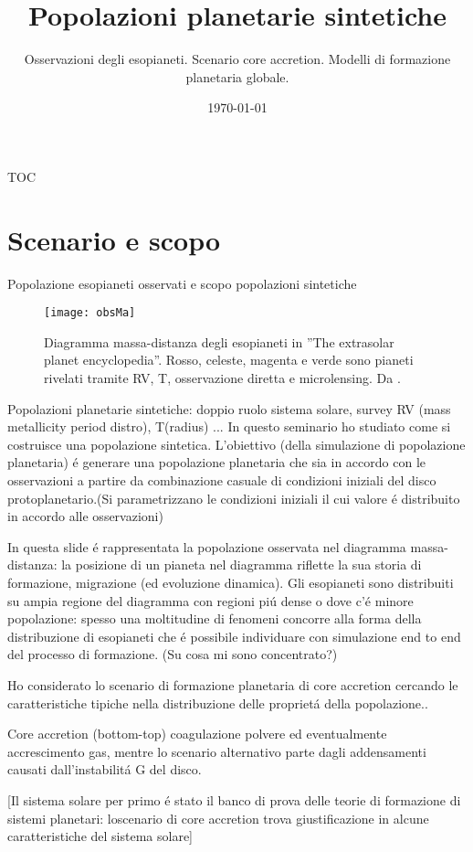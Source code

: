 \documentclass[10pt,xcolor={usenames},fleqn,serif]{beamer}
\title{Popolazioni planetarie sintetiche}
\subtitle{Osservazioni degli esopianeti. Scenario core accretion. Modelli di formazione planetaria globale.}
\date{\today}
\begin{document}
\begin{frame}
  \titlepage
\end{frame}

\begin{frame}{TOC}
\tableofcontents[onlyparts]
\end{frame}

\part{Scenario e scopo}


\begin{frame}[label={intro}]{Popolazione esopianeti osservati e scopo popolazioni sintetiche}
\begin{figure}[!ht]
	\texttt{[image: obsMa]}
	\caption{Diagramma massa-distanza degli esopianeti in ''The extrasolar planet encyclopedia''. Rosso, celeste, magenta e verde sono pianeti rivelati tramite RV, T, osservazione diretta e microlensing. Da \cite{mordasini2018planetary}.}\label{fig:Maplot}
\end{figure}
\end{frame}

\begin{wordonframe}{Popolazioni planetarie sintetiche: doppio ruolo sistema solare, survey RV (mass metallicity period distro), T(radius) ...}
In questo seminario ho studiato come si costruisce una popolazione sintetica. L'obiettivo (della simulazione di popolazione planetaria) \'e generare una popolazione planetaria che sia in accordo con le osservazioni a partire da combinazione casuale di condizioni iniziali del disco protoplanetario.(Si parametrizzano le condizioni iniziali il cui valore \'e distribuito in accordo alle osservazioni)

In questa slide \'e rappresentata la popolazione osservata nel diagramma massa-distanza: la posizione di un pianeta nel diagramma riflette la sua storia di formazione, migrazione (ed evoluzione dinamica). Gli esopianeti sono distribuiti su ampia regione del diagramma con regioni pi\'u dense o dove c'\'e minore popolazione: spesso una moltitudine di fenomeni concorre alla forma della distribuzione di esopianeti che \'e possibile individuare con simulazione end to end del processo di formazione.
(Su cosa mi sono concentrato?)

Ho considerato lo scenario di formazione planetaria di core accretion cercando le caratteristiche tipiche nella distribuzione delle propriet\'a della popolazione..

Core accretion (bottom-top) coagulazione polvere ed eventualmente accrescimento gas, mentre lo scenario alternativo parte dagli addensamenti causati dall'instabilit\'a G del disco.

[Il sistema solare per primo \'e stato il banco di prova delle teorie di formazione di sistemi planetari: loscenario di core accretion trova giustificazione in alcune caratteristiche del sistema solare]

\end{wordonframe}
\end{document}

